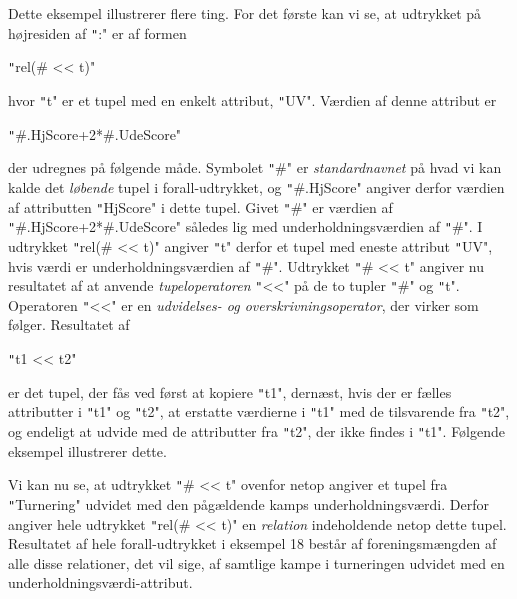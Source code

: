 \documentclass{article}
\newcounter{eks}
\begin{document}
Dette eksempel illustrerer flere ting. For det f\o{}rste kan vi se, at
udtrykket p\aa{} h\o{}jresiden af \texttt":" er af formen
\begin{center}
\texttt"rel(# << t)"
\end{center}
hvor \texttt"t" er et tupel med en enkelt attribut, \texttt"UV".
V\ae{}rdien af denne attribut er
\begin{center}
\texttt"#.HjScore+2*#.UdeScore"
\end{center}
der udregnes p\aa{} f\o{}lgende m\aa{}de.
Symbolet \texttt"#" er {\em standardnavnet\/} p\aa{} hvad vi kan kalde
det {\em l\o{}bende\/} tupel i forall-udtrykket, og
\texttt"#.HjScore" angiver derfor v\ae{}rdien af attributten
\texttt"HjScore" i dette tupel. Givet \texttt"#" er v\ae{}rdien af
\texttt"#.HjScore+2*#.UdeScore" s\aa{}ledes lig med underholdnings\-v\ae{}rdien
af \texttt"#". I udtrykket \texttt"rel(# << t)" angiver \texttt"t" derfor
et tupel med eneste attribut \texttt"UV", hvis v\ae{}rdi er
underholdningsv\ae{}rdien af \texttt"#". Udtrykket \texttt"# << t"
angiver nu resultatet af at anvende {\em tupeloperatoren\/}
\texttt"<<" p\aa{} de to tupler \texttt"#" og \texttt"t". Operatoren
\texttt"<<" er en {\em udvidelses- og overskrivningsoperator}, der virker
som f\o{}lger. Resultatet af
\begin{center}
\texttt"t1 << t2"
\end{center}
er det tupel, der f\aa{}s ved f\o{}rst at kopiere \texttt"t1",
dern\ae{}st, hvis der er f\ae{}lles attributter i \texttt"t1" og \texttt"t2",
at erstatte v\ae{}rdierne i \texttt"t1" med de tilsvarende fra \texttt"t2",
og endeligt at udvide med de attributter fra \texttt"t2", der ikke findes
i \texttt"t1". F\o{}lgende eksempel illustrerer dette.


Vi kan nu se, at udtrykket \texttt"# << t" ovenfor netop angiver et tupel
fra \texttt"Turnering" udvidet med den p\aa{}g\ae{}ldende kamps
underholdningsv\ae{}rdi. Derfor angiver hele udtrykket
\texttt"rel(# << t)" en {\em relation\/} indeholdende netop dette tupel.
Resultatet af hele forall-udtrykket i eksempel 18 best\aa{}r af
foreningsm\ae{}ngden af alle disse relationer, det vil sige,
af samtlige kampe i turneringen udvidet med en
underholdningsv\ae{}rdi-attribut.
\end{document}

